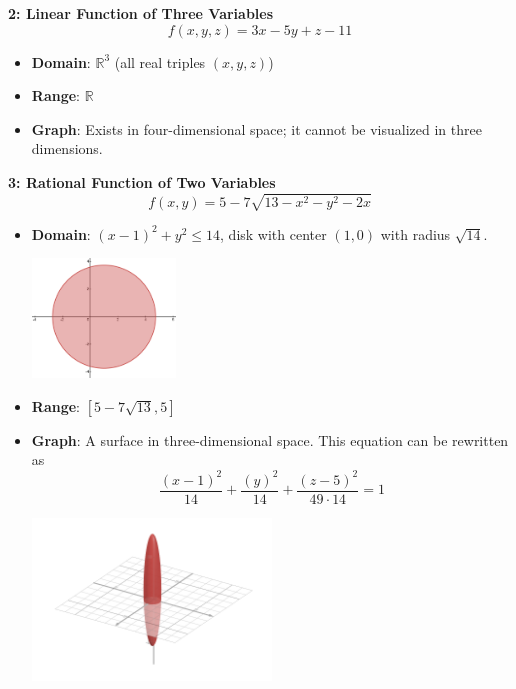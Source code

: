 \textbf{2: Linear Function of Three Variables}
    \[
    f(x, y, z) = 3x - 5y + z - 11
    \]
    \begin{itemize}
        \item \textbf{Domain}: \(\mathbb{R}^3\) (all real triples \((x, y, z)\))
        \item \textbf{Range}: \(\mathbb{R}\)
        \item \textbf{Graph}: Exists in four-dimensional space; it cannot be visualized in three dimensions.
    \end{itemize}
\textbf{3: Rational Function of Two Variables}
    \[
        f(x, y) = 5 - 7 \sqrt{13-x^2-y^2-2x}
    \]
    \begin{itemize}
        \item \textbf{Domain}: $(x-1)^2+y^2 \leq 14$, disk with center $(1, 0)$ with radius $\sqrt{14}$.
        \begin{center}
            \includegraphics[width=0.3\textwidth]{domain1.png}
        \end{center}
        \item \textbf{Range}: $\left[5-7\sqrt{13}, 5\right]$
        \item \textbf{Graph}: A surface in three-dimensional space. This equation can be rewritten as 
        \[
            \dfrac{\left(x-1\right)^{2}}{14}+\dfrac{\left(y\right)^{2}}{14}+\dfrac{\left(z-5\right)^{2}}{49\cdot14}=1
        \] 
        \begin{center}
            \includegraphics[width=0.5\textwidth]{graph1.png}
        \end{center}
    \end{itemize}

